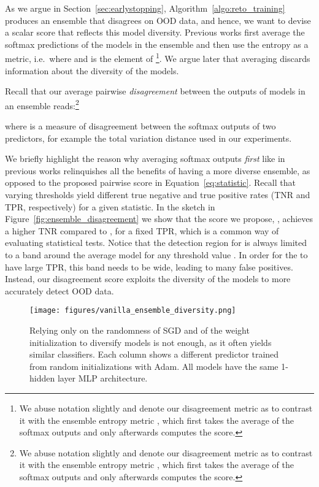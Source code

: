 As we argue in Section~\ref{sec:earlystopping},
Algorithm~\ref{algo:reto_training} produces an ensemble that disagrees on OOD
data, and hence, we want to devise a scalar score that reflects this model
diversity.
Previous works \citep{balaji, ood_ovadia} first average the softmax predictions
of the models in the ensemble and then use the entropy as a metric, i.e.\
 where
 and  is the 
element of \footnote{We abuse notation slightly and
  denote our disagreement metric as  to contrast it with the ensemble
  entropy metric , which first takes the average of the softmax outputs
and only afterwards computes the score.}. We argue later that averaging discards
information about the diversity of the models.

Recall that our average pairwise \emph{disagreement} between the outputs of 
models in an ensemble reads:\footnote{We abuse notation slightly and denote our
  disagreement metric as  to contrast it with the ensemble entropy metric
  , which first takes the average of the softmax outputs and only
afterwards computes the score.}



\noindent where  is a measure of disagreement between the softmax outputs
of two predictors, for example the total variation distance
 used in
our experiments.



We briefly highlight the reason why averaging softmax outputs \emph{first} like
in previous works relinquishes all the benefits of having a more diverse
ensemble, as opposed to the proposed pairwise score in
Equation~\ref{eq:statistic}. Recall that varying thresholds yield different true
negative and true positive rates (TNR and TPR, respectively) for a given
statistic.
In the sketch in Figure~\ref{fig:ensemble_disagreement} we show that the score
we propose, , achieves a higher TNR compared to , for a fixed
TPR, which is a common way of evaluating statistical tests. Notice that the
detection region for  is always limited to a band around the average
model for any threshold value . In order for the  to have large
TPR, this band needs to be wide, leading to many false positives. Instead, our
disagreement score exploits the diversity of the models to more accurately
detect OOD data. 

\begin{figure}[t]
  \begin{center}
    \texttt{[image: figures/vanilla\_ensemble\_diversity.png]}
  \end{center}

  \caption{Relying only on the randomness of SGD and of the weight
    initialization to diversify models is not enough, as it often yields similar
    classifiers. Each column shows a different predictor trained from random
    initializations with Adam. All models have the same 1-hidden layer MLP
  architecture.}

  \label{fig:vanilla_diversity}
\end{figure}

